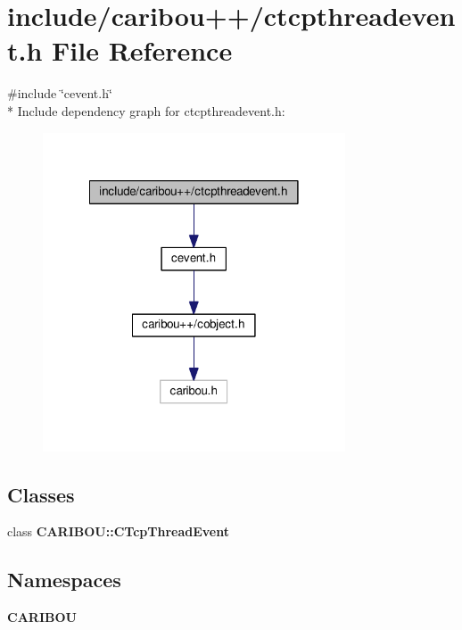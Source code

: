 \section{include/caribou++/ctcpthreadevent.h File Reference}
\label{ctcpthreadevent_8h}
{\ttfamily \#include \char`\"{}cevent.\-h\char`\"{}}\\*
Include dependency graph for ctcpthreadevent.\-h\-:\nopagebreak
\begin{figure}[H]
\begin{center}
\leavevmode
\includegraphics[width=254pt]{ctcpthreadevent_8h__incl}
\end{center}
\end{figure}
\subsection*{Classes}
\begin{DoxyCompactItemize}
\item 
class {\bf C\-A\-R\-I\-B\-O\-U\-::\-C\-Tcp\-Thread\-Event}
\end{DoxyCompactItemize}
\subsection*{Namespaces}
\begin{DoxyCompactItemize}
\item 
{\bf C\-A\-R\-I\-B\-O\-U}
\end{DoxyCompactItemize}
